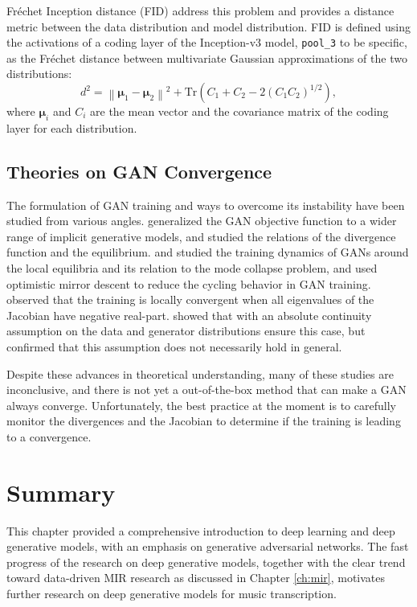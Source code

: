Fréchet Inception distance (FID) \cite{heusel2017ttur} address this problem and provides a distance metric between the data distribution and model distribution.
FID is defined using the activations of a coding layer of the Inception-v3 model, \texttt{pool\_3} to be specific, as the Fréchet distance between multivariate Gaussian approximations of the two distributions:
\begin{equation}\label{eqn:fid}
d^2 = \left \lVert \bm{\mu}_1 - \bm{\mu}_2 \right \rVert^2 + \mathrm{Tr} \left ( C_1 + C_2 - 2 ( C_1 C_2 )^{1/2} \right ),
\end{equation}
where $\bm{\mu}_i$ and $C_i$ are the mean vector and the covariance matrix of the coding layer for each distribution.

\subsection{Theories on GAN Convergence}

The formulation of GAN training and ways to overcome its instability have been studied from various angles.
 generalized the GAN objective function to a wider range of implicit generative models, and  studied the relations of the divergence function and the equilibrium.
 and  studied the training dynamics of GANs around the local equilibria and its relation to the mode collapse problem, and  used optimistic mirror descent to reduce the cycling behavior in GAN training.
 observed that the training is locally convergent when all eigenvalues of the Jacobian have negative real-part.
 showed that with an absolute continuity assumption on the data and generator distributions ensure this case, but  confirmed that this assumption does not necessarily hold in general.

Despite these advances in theoretical understanding, many of these studies are inconclusive, and there is not yet a out-of-the-box method that can make a GAN always converge.
Unfortunately, the best practice at the moment is to carefully monitor the divergences and the Jacobian to determine if the training is leading to a convergence.


\section{Summary}
This chapter provided a comprehensive introduction to deep learning and deep generative models, with an emphasis on generative adversarial networks.
The fast progress of the research on deep generative models, together with the clear trend toward data-driven MIR research as discussed in Chapter \ref{ch:mir}, motivates further research on deep generative models for music transcription.
